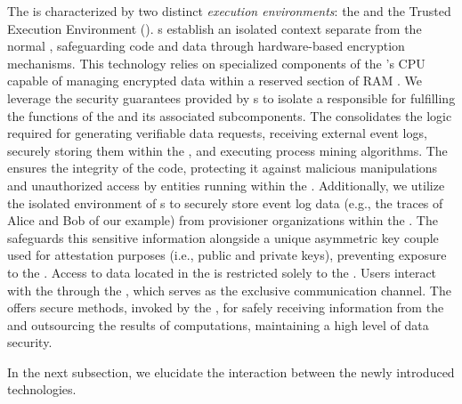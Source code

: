 The  is characterized by two distinct \textit{execution environments}: the  and the Trusted Execution Environment (). s establish an isolated context separate from the normal , safeguarding code and data through hardware-based encryption mechanisms. This technology relies on specialized components of the 's CPU capable of managing encrypted data within a reserved section of RAM \cite{TEEHERE}. We leverage the security guarantees provided by s to isolate a  responsible for fulfilling the functions of the  and its associated subcomponents. The  consolidates the logic required for generating verifiable data requests, receiving external event logs, securely storing them within the , and executing process mining algorithms. %
The  ensures the integrity of the  code, protecting it against malicious manipulations and unauthorized access by entities running within the . Additionally, we utilize the isolated environment of s to securely store event log data (e.g., the traces of Alice and Bob of our example) from provisioner organizations within the . The  safeguards this sensitive information alongside a unique asymmetric key couple used for attestation purposes (i.e., public and private keys), preventing exposure to the . Access to data located in the  is restricted solely to the . Users interact with the  through the , which serves as the exclusive communication channel. The  offers secure methods, invoked by the , for safely receiving information from the  and outsourcing the results of computations, maintaining a high level of data security.

In the next subsection, we elucidate the interaction between the newly introduced technologies.

